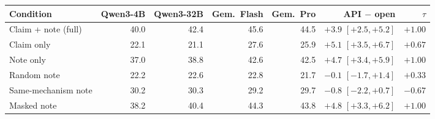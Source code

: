 \begin{tabular}{@{}lrrrrrr@{}}
\toprule
Condition & Qwen3-4B & Qwen3-32B & Gem.\ Flash & Gem.\ Pro & API $-$ open & $\tau$ \\
\midrule
Claim + note (full) & 40.0 & 42.4 & 45.6 & 44.5 & $+3.9$ $[+2.5,+5.2]$ & $+1.00$ \\
Claim only & 22.1 & 21.1 & 27.6 & 25.9 & $+5.1$ $[+3.5,+6.7]$ & $+0.67$ \\
Note only & 37.0 & 38.8 & 42.6 & 42.5 & $+4.7$ $[+3.4,+5.9]$ & $+1.00$ \\
Random note & 22.2 & 22.6 & 22.8 & 21.7 & $-0.1$ $[-1.7,+1.4]$ & $+0.33$ \\
Same-mechanism note & 30.2 & 30.3 & 29.2 & 29.7 & $-0.8$ $[-2.2,+0.7]$ & $-0.67$ \\
Masked note & 38.2 & 40.4 & 44.3 & 43.8 & $+4.8$ $[+3.3,+6.2]$ & $+1.00$ \\
\bottomrule
\end{tabular}

